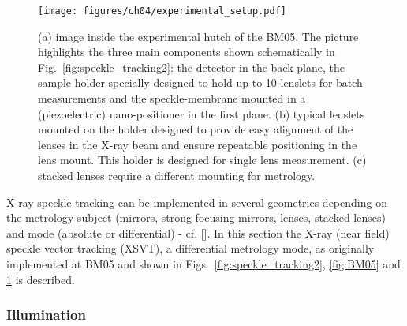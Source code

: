 \begin{refsection}
\begin{figure}[t]
        \centering
        {\texttt{[image: figures/ch04/experimental\_setup.pdf]}}
        \caption[Experimental setup at the BM05 beamline, ESRF.]{(a) image inside the experimental hutch of the BM05. The picture highlights the three main components shown schematically in Fig.~\ref{fig:speckle_tracking2}: the detector in the back-plane, the sample-holder specially designed to hold up to 10 lenslets for batch measurements and the speckle-membrane mounted in a (piezoelectric) nano-positioner in the first plane. (b) typical lenslets mounted on the holder designed to provide easy alignment of the lenses in the X-ray beam and ensure repeatable positioning in the lens mount. This holder is designed for single lens measurement. (c) stacked lenses require a different mounting for metrology.} \label{fig:experimental_setup}
\end{figure}


X-ray speckle-tracking can be implemented in several geometries depending on the metrology subject (mirrors, strong focusing mirrors, lenses, stacked lenses) and mode (absolute or differential) - cf. [\cite{Berujon2020a}]. In this section the X-ray (near field) speckle vector tracking (XSVT), a differential metrology mode, as originally implemented at BM05 and shown in Figs.~\ref{fig:speckle_tracking2}, \ref{fig:BM05} and \ref{fig:experimental_setup} is described.

\subsubsection*{Illumination}


\end{refsection}
